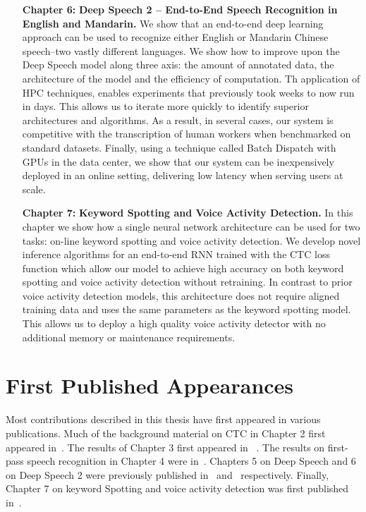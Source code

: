 \begin{itemize}
    \item [{\bf Chapter 6:}]{\bf Deep Speech 2 -- End-to-End Speech Recognition
        in English and Mandarin.} We show that an end-to-end deep learning
        approach can be used to recognize either English or Mandarin Chinese
        speech–two vastly different languages. We show how to improve upon the
        Deep Speech model along three axis: the amount of annotated data, the
        architecture of the model and the efficiency of computation.  Th
        application of HPC techniques, enables experiments that previously took
        weeks to now run in days. This allows us to iterate more quickly to
        identify superior architectures and algorithms.  As a result, in
        several cases, our system is competitive with the transcription of
        human workers when benchmarked on standard datasets.  Finally, using a
        technique called Batch Dispatch with GPUs in the data center, we show
        that our system can be inexpensively deployed in an online setting,
        delivering low latency when serving users at scale.

    \item [{\bf Chapter 7:}]{\bf Keyword Spotting and Voice Activity
        Detection.} In this chapter we show how a single neural network
        architecture can be used for two tasks: on-line keyword spotting and
        voice activity detection. We develop novel inference algorithms for an
        end-to-end RNN trained with the CTC loss function which allow our model
        to achieve high accuracy on both keyword spotting and voice activity
        detection without retraining. In contrast to prior voice activity
        detection models, this architecture does not require aligned training
        data and uses the same parameters as the keyword spotting model. This
        allows us to deploy a high quality voice activity detector with no
        additional memory or maintenance requirements.

\end{itemize}

\section{First Published Appearances}

Most contributions described in this thesis have first appeared in various
publications. Much of the background material on CTC in Chapter 2 first
appeared in~\cite{rajpurkar2017}. The results of Chapter 3 first appeared in
~\cite{hannun2017sequence}. The results on first-pass speech recognition in
Chapter 4 were in~\cite{hannun2014firstpass}. Chapters 5 on Deep Speech and 6
on Deep Speech 2 were previously published in~\cite{hannun2014deepspeech}
and~\cite{amodei2016deep} respectively. Finally, Chapter 7 on keyword Spotting
and voice activity detection was first published in~\cite{lengerich2016}.
